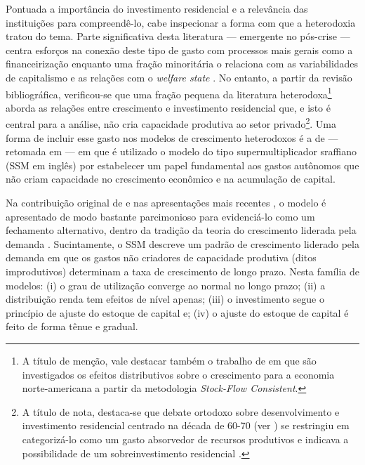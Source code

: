 Pontuada a importância do investimento residencial e a relevância das instituições para compreendê-lo, cabe inspecionar a forma com que a heterodoxia tratou do tema. Parte significativa desta literatura  --- emergente no pós-crise --- centra esforços na conexão deste tipo de gasto com processos mais gerais como a financeirização \cites{aalbers_financialization_2008}{bibow_financialization_2010} enquanto uma fração minoritária o relaciona com as variabilidades de capitalismo e as relações com o \textit{welfare state} \cite{schwartz_politics_2009}. 
No entanto, a partir da revisão bibliográfica, verificou-se que uma fração pequena da literatura heterodoxa\footnote{
	A título de menção, vale destacar também o trabalho de \textcite{zezza_u.s._2008} em que são investigados os efeitos distributivos sobre o crescimento para a economia norte-americana a partir da metodologia \textit{Stock-Flow Consistent}.}
aborda as relações entre crescimento e investimento residencial que, e isto é central para a análise, não cria capacidade produtiva ao setor privado\footnote{A título de nota, destaca-se que debate ortodoxo sobre desenvolvimento e investimento residencial centrado na década de 60-70 (ver \textcite{arku_housing_2006}) se restringiu em categorizá-lo como um gasto absorvedor de recursos produtivos e indicava  a possibilidade de um sobreinvestimento residencial \cites{solow_importance_1995}{mills_has_1987}. }. 
Uma forma de incluir esse gasto nos modelos de crescimento heterodoxos é a de \textcite{teixeira_crescimento_2015} --- retomada em \textcite{da_silveira_investimento_2019} --- em que é utilizado o modelo do tipo supermultiplicador sraffiano (SSM em inglês) por estabelecer um papel fundamental aos gastos autônomos que não criam capacidade no crescimento econômico e na acumulação de capital.



Na contribuição original de \textcite{serrano_sraffian_1995} e nas apresentações mais recentes \cite{freitas_growth_2015}, o modelo é apresentado de modo bastante parcimonioso para evidenciá-lo como um fechamento alternativo, dentro da tradição da teoria do crescimento liderada pela demanda \cite{serrano_sraffian_2017}. 
Sucintamente, o SSM descreve um padrão de crescimento liderado pela demanda em que os gastos não criadores de capacidade produtiva (ditos improdutivos) determinam a taxa de crescimento de longo prazo. 
Nesta família de modelos: 
	(i) o grau de utilização converge ao normal no longo prazo; 
	(ii) a distribuição renda tem efeitos de nível apenas; 
	(iii) o investimento segue o princípio de ajuste do estoque de capital e;
	(iv) o ajuste do estoque de capital é feito de forma tênue e gradual. 
	
